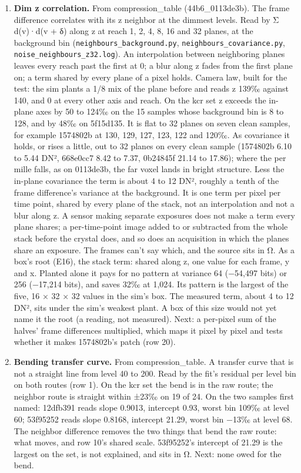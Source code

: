 \begin{enumerate}
\item \textbf{Dim z correlation.} From compression\_\allowbreak{}table (44b6\_\allowbreak{}0113de3b). The frame difference correlates with its z neighbor at the dimmest levels. Read by Σ d(v)·d(v + δ) along z at reach 1, 2, 4, 8, 16 and 32 planes, at the background bin (\texttt{neighbours\_\allowbreak{}background.\allowbreak{}py}, \texttt{neighbours\_\allowbreak{}covariance.\allowbreak{}py}, \texttt{noise\_\allowbreak{}neighbours\_\allowbreak{}z32.\allowbreak{}log}). An interpolation between neighboring planes leaves every reach past the first at 0; a blur along z fades from the first plane on; a term shared by every plane of a pixel holds. Camera law, built for the test: the sim plants a 1/8 mix of the plane before and reads z 139‰ against 140, and 0 at every other axis and reach. On the kcr set z exceeds the in-plane axes by 50 to 124‰ on the 15 samples whose background bin is 8 to 128, and by 48‰ on 5f15d135. It is flat to 32 planes on seven clean samples, for example 1574802b at 130, 129, 127, 123, 122 and 120‰. As covariance it holds, or rises a little, out to 32 planes on every clean sample (1574802b 6.10 to 5.44 DN², 668e0cc7 8.42 to 7.37, 0b24845f 21.14 to 17.86); where the per mille falls, as on 0113de3b, the far voxel lands in bright structure. Less the in-plane covariance the term is about 4 to 12 DN², roughly a tenth of the frame difference's variance at the background. It is one term per pixel per time point, shared by every plane of the stack, not an interpolation and not a blur along z. A sensor making separate exposures does not make a term every plane shares; a per-time-point image added to or subtracted from the whole stack before the crystal does, and so does an acquisition in which the planes share an exposure. The frames can't say which, and the source sits in Ω. As a box's root (E16), the stack term: shared along z, one value for each frame, y and x. Planted alone it pays for no pattern at variance 64 (−54,497 bits) or 256 (−17,214 bits), and saves 32‰ at 1,024. Its pattern is the largest of the five, 16 × 32 × 32 values in the sim's box. The measured term, about 4 to 12 DN², sits under the sim's weakest plant. A box of this size would not yet name it the root (a reading, not measured). Next: a per-pixel sum of the halves' frame differences multiplied, which maps it pixel by pixel and tests whether it makes 1574802b's patch (row 20).
\item \textbf{Bending transfer curve.} From compression\_\allowbreak{}table. A transfer curve that is not a straight line from level 40 to 200. Read by the fit's residual per level bin on both routes (row 1). On the kcr set the bend is in the raw route; the neighbor route is straight within ±23‰ on 19 of 24. On the two samples first named: 12dfb391 reads slope 0.9013, intercept 0.93, worst bin 109‰ at level 60; 53f95252 reads slope 0.8168, intercept 21.29, worst bin −13‰ at level 68. The neighbor difference removes the two things that bend the raw route: what moves, and row 10's shared scale. 53f95252's intercept of 21.29 is the largest on the set, is not explained, and sits in Ω. Next: none owed for the bend.

\end{enumerate}
